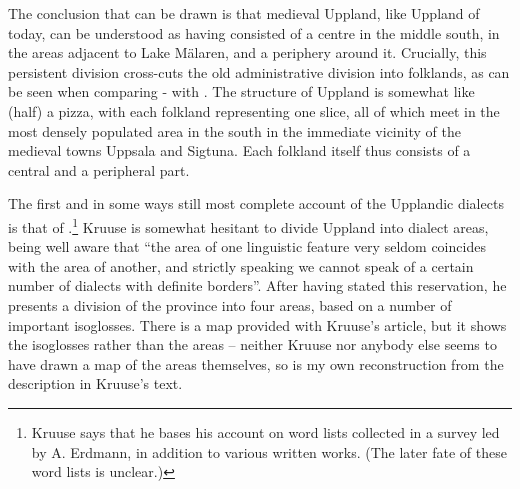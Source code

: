 The conclusion that can be drawn is that medieval Uppland, like Uppland of today, can be understood as having consisted of a centre in the middle south, in the areas adjacent to Lake Mälaren, and a periphery around it. Crucially, this persistent division cross-cuts the old administrative division into folklands, as can be seen when comparing - with . The structure of Uppland is somewhat like (half) a pizza, with each folkland representing one slice, all of which meet in the most densely populated area in the south in the immediate vicinity of the medieval towns Uppsala and Sigtuna. Each folkland itself thus consists of a central and a peripheral part. 

 The first and in some ways still most complete account of the Upplandic dialects is that of \citet{Kruuse1908}.\footnote{ Kruuse says that he bases his account on word lists collected in a survey led by A. Erdmann, in addition to various written works. (The later fate of these word lists is unclear.) } Kruuse is somewhat hesitant to divide Uppland into dialect areas, being well aware that “the area of one linguistic feature very seldom coincides with the area of another, and strictly speaking we cannot speak of a certain number of dialects with definite borders”. After having stated this reservation, he presents a division of the province into four areas, based on a number of important isoglosses. There is a map provided with Kruuse’s article, but it shows the isoglosses rather than the areas – neither Kruuse nor anybody else seems to have drawn a map of the areas themselves, so  is my own reconstruction from the description in Kruuse’s text. 

